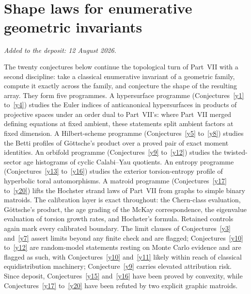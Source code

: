 \documentclass[11pt]{article}
\theoremstyle{definition}
\begin{document}
\part{Shape laws for enumerative geometric invariants}

\medskip\noindent\emph{Added to the deposit: 12 August 2026.}\par\medskip

The twenty conjectures below continue the topological turn of Part~VII with a second discipline: take a classical enumerative invariant of a geometric family, compute it exactly across the family, and conjecture the shape of the resulting array.  They form five programmes.  A hypersurface programme (Conjectures~\ref{y1} to~\ref{y4}) studies the Euler indices of anticanonical hypersurfaces in products of projective spaces under an order dual to Part~VII's: where Part~VII merged defining equations at fixed ambient, these statements split ambient factors at fixed dimension.  A Hilbert-scheme programme (Conjectures~\ref{y5} to~\ref{y8}) studies the Betti profiles of G\"ottsche's product over a proved pair of exact moment identities.  An orbifold programme (Conjectures~\ref{y9} to~\ref{y12}) studies the twisted-sector age histograms of cyclic Calabi--Yau quotients.  An entropy programme (Conjectures~\ref{y13} to~\ref{y16}) studies the exterior torsion-entropy profile of hyperbolic toral automorphisms.  A matroid programme (Conjectures~\ref{y17} to~\ref{y20}) lifts the Hochster strand laws of Part~VII from graphs to simple binary matroids.  The calibration layer is exact throughout: the Chern-class evaluation, G\"ottsche's product, the age grading of the McKay correspondence, the eigenvalue evaluation of torsion growth rates, and Hochster's formula.  Retained controls again mark every calibrated boundary.  The limit clauses of Conjectures~\ref{y3} and~\ref{y7} assert limits beyond any finite check and are flagged; Conjectures~\ref{y10} to~\ref{y12} are random-model statements resting on Monte Carlo evidence and are flagged as such, with Conjectures~\ref{y10} and~\ref{y11} likely within reach of classical equidistribution machinery; Conjecture~\ref{y9} carries elevated attribution risk.  Since deposit, Conjectures~\ref{y15} and~\ref{y16} have been proved by convexity, while Conjectures~\ref{y17} to~\ref{y20} have been refuted by two explicit graphic matroids.
\end{document}
